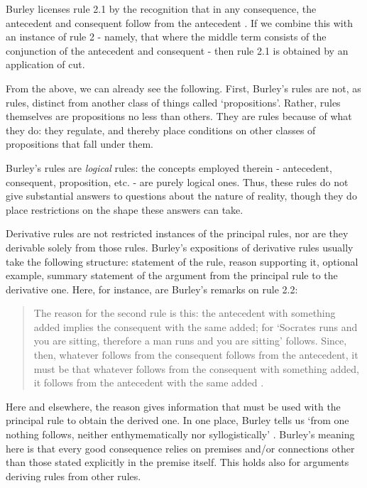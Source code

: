 \documentclass[]{article}
\begin{document}
Burley licenses rule 2.1 by the recognition that in any consequence, the antecedent and consequent follow from the antecedent \cite[p. 62.27-28]{BurleyDPAL}. If we combine this with an instance of rule 2 - namely, that where the middle term consists of the conjunction of the antecedent and consequent - then rule 2.1 is obtained by an application of cut.

From the above, we can already see the following. First, Burley's rules are not, as rules, distinct from another class of things called `propositions'. Rather, rules themselves are propositions no less than others. They are rules because of what they do: they regulate, and thereby place conditions on other classes of propositions that fall under them. 

Burley's rules are \textit{logical} rules: the concepts employed therein - antecedent, consequent, proposition, etc. - are purely logical ones. Thus, these rules do not give substantial answers to questions about the nature of reality, though they do place restrictions on the shape these answers can take.

Derivative rules are not restricted instances of the principal rules, nor are they derivable solely from those rules. Burley's expositions of derivative rules usually take the following structure: statement of the rule, reason supporting it, optional example, summary statement of the argument from the principal rule to the derivative one. Here, for instance, are Burley's remarks on rule 2.2: 
\begin{quote}
	The reason for the second rule is this: the antecedent with something added implies the consequent with the same added; for `Socrates runs and you are sitting, therefore a man runs and you are sitting' follows. Since, then, whatever follows from the consequent follows from the antecedent, it must be that whatever follows from the consequent with something added, it follows from the antecedent with the same added \cite[p. 62.33-38]{BurleyDPAL}.
\end{quote}

Here and elsewhere, the reason gives information that must be used with the principal rule to obtain the derived one. In one place, Burley tells us `from one nothing follows, neither enthymematically nor syllogistically' \cite[p. 147, par. 130]{Green-Pedersen1980b}. Burley's meaning here is that every good consequence relies on premises and/or connections other than those stated explicitly in the premise itself. This holds also for arguments deriving rules from other rules. 
\end{document}

